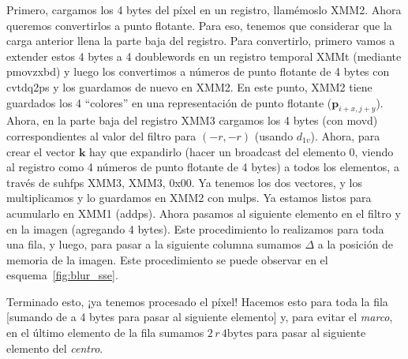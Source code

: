 Primero, cargamos los 4 bytes del píxel en un registro, llamémoslo
{\ttfamily XMM2}. Ahora queremos convertirlos a punto flotante. Para
eso, tenemos que considerar que la carga anterior llena la parte baja
del registro. Para convertirlo, primero vamos a extender estos 4 bytes
a 4 doublewords en un registro temporal {\ttfamily XMMt} (mediante
{\ttfamily pmovzxbd}) y luego los convertimos a números de punto
flotante de 4 bytes con {\ttfamily cvtdq2ps} y los guardamos de nuevo
en {\ttfamily XMM2}. En este punto, {\ttfamily XMM2} tiene guardados
los 4 ``colores'' en una representación de punto flotante
($\mathbf{p}_{i+x, j+y}$). Ahora, en la parte baja del registro
{\ttfamily XMM3} cargamos los 4 bytes (con {\ttfamily movd})
correspondientes al valor del filtro para $(-r, -r)$ (usando
$d_{1v}$). Ahora, para crear el vector $\mathbf{k}$ hay que
expandirlo (hacer un broadcast del elemento 0, viendo al registro como
4 números de punto flotante de 4 bytes) a todos los elementos, a
través de {\ttfamily suhfps XMM3, XMM3, 0x00}. Ya tenemos los dos
vectores, y los multiplicamos y lo guardamos en {\ttfamily XMM2} con
{\ttfamily mulps}. Ya estamos listos para acumularlo en {\ttfamily
  XMM1} ({\ttfamily addps}). Ahora pasamos al siguiente elemento en el
filtro y en la imagen (agregando 4 bytes). Este procedimiento lo
realizamos para toda una fila, y luego, para pasar a la siguiente
columna sumamos $\Delta$ a la posición de memoria de la
imagen. Este procedimiento se puede observar en el
esquema~\ref{fig:blur_sse}. 

Terminado esto, ¡ya tenemos procesado el píxel! Hacemos esto para toda
la fila [sumando de a 4 bytes para pasar al siguiente elemento] y,
para evitar el \emph{marco}, en el último elemento de la fila sumamos
$2\,r \, 4\text{bytes}$ para pasar al siguiente elemento del
\emph{centro}.

